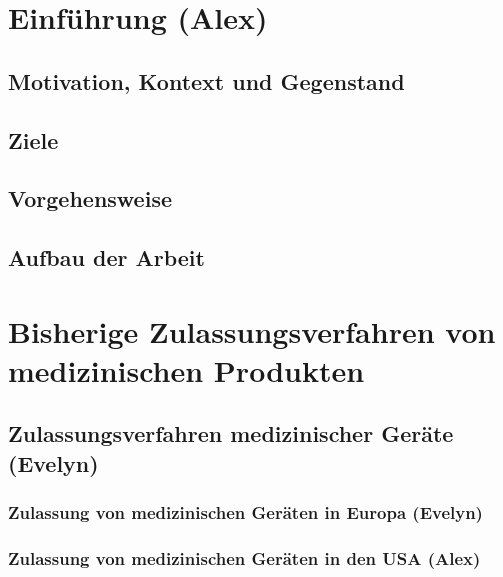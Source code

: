 \documentclass[a4paper, 11pt]{article}
\begin{document}
    \pagestyle{empty}
    
    \newpage
    
        
    \newpage
    \hypertarget{contents}{}
    \tableofcontents

    \newpage
    \pagestyle{fancy}
    \section{Einführung \small{(Alex)}}\label{sec:introduction}
        
		\subsection{Motivation, Kontext und Gegenstand}\label{sec:motivationcontext}
			
		\subsection{Ziele}\label{sec:goals}
			
		\subsection{Vorgehensweise}\label{sec:procedure}
			
		\subsection{Aufbau der Arbeit}\label{sec:structure}
			

	\newpage
	\section{Bisherige Zulassungsverfahren von medizinischen Produkten}\label{sec:admission}
		
		\subsection{Zulassungsverfahren medizinischer Geräte \small{(Evelyn)}}\label{sec:medproducts}
					
			\subsubsection{Zulassung von medizinischen Geräten in Europa \small{(Evelyn)}}\label{sec:europe-no-ai}
				
			\subsubsection{Zulassung von medizinischen Geräten in den USA \small{(Alex)}}\label{sec:us-no-ai}
					
\end{document}
